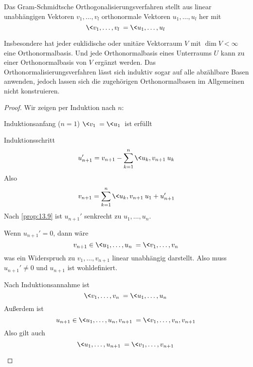\documentclass{mycourse}
\begin{document}
\begin{thm}
	\label{thm:13.11}
	Das Gram-Schmidtsche Orthogonalisierungsverfahren stellt aus linear unabhängigen Vektoren $v_1,\dotsc,v_l$ orthonormale Vektoren $u_1,\dotsc,u_l$ her mit
	\[
		\<v_1,\dotsc,v_l\> = \<u_1,\dotsc,u_l\>
	\]
	\begin{note}
		Insbesondere hat jeder euklidische oder unitäre Vektorraum $V$ mit $\dim V<\infty$ eine Orthonormalbasis.
		Und jede Orthonormalbasis eines Unterraums $U$ kann zu einer Orthonormalbasis von $V$ ergänzt werden. 
		Das Orthonormalisierungsverfahren lässt sich induktiv sogar auf alle abzählbare Basen anwenden, jedoch lassen
		sich die zugehörigen Orthonormalbasen im Allgemeinen nicht konstruieren.
	\end{note}
	\begin{proof}
		Wir zeigen per Induktion nach $n$:
		\begin{seg}{Induktionsanfang ($n=1$)}
			$\<v_1\> = \<u_1\>$ ist erfüllt
		\end{seg}
		\begin{seg}{Induktionsschritt}
			\[
				u_{n+1}' = v_{n+1}-\sum_{k=1}^n\<u_k,v_{n+1}\>u_k
			\]
			Also
			\[
				v_{n+1} = \sum_{k=1}^n \<u_k,v_{n+1}\>u_1 + u_{n+1}'
			\]
			Nach \ref{prop:13.9} ist $u_{n+1}'$ senkrecht zu $u_1,\dotsc,u_n$.

			Wenn $u_{n+1}' = 0$, dann wäre
			\[
				v_{n+1} \in \<u_1,\dotsc,u_n\> = \<v_1,\dotsc,v_n\>
			\]
			was ein Widerspruch zu $v_1,\dotsc,v_{n+1}$ linear unabhängig darstellt.
			Also muss $u_{n+1}' \neq 0$ und $u_{n+1}$ ist wohldefiniert.

			Nach Induktionsannahme ist
			\[
				\<v_1,\dotsc,v_n\> = \<u_1,\dotsc,u_n\>
			\]
			Außerdem ist
			\[
				u_{n+1}\in \<u_1,\dotsc,u_n,v_{n+1}\>  =\<v_1,\dotsc,v_n,v_{n+1}\>
			\]
			Also gilt auch
			\[
				\<u_1,\dotsc,u_{n+1}\> = \<v_1,\dotsc,v_{n+1}\>
			\]
		\end{seg}
	\end{proof}
\end{thm}
\end{document}
